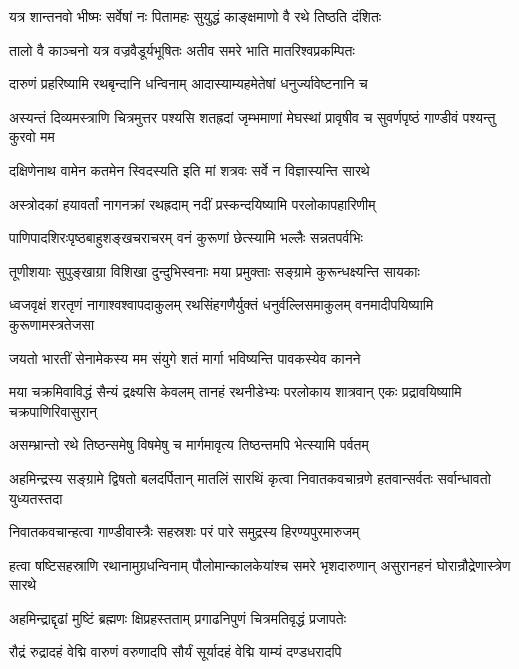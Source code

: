 \twolineshloka
{यत्र शान्तनवो भीष्मः सर्वेषां नः पितामहः}
{सुयुद्धं काङ्क्षमाणो वै रथे तिष्ठति दंशितः}


\twolineshloka
{तालो वै काञ्चनो यत्र वज्रवैडूर्यभूषितः}
{अतीव समरे भाति मातरिश्वप्रकम्पितः}


\twolineshloka
{दारुणं प्रहरिष्यामि रथबृन्दानि धन्विनाम्}
{आदास्याम्यहमेतेषां धनुर्ज्यावेष्टनानि च}


\onelineshloka
{अस्यन्तं दिव्यमस्त्राणि चित्रमुत्तर पश्यसि}
\twolineshloka
{शतह्रदां जृम्भमाणां मेघस्थां प्रावृषीव च}
{सुवर्णपृष्ठं गाण्डीवं पश्यन्तु कुरवो मम}


\twolineshloka
{दक्षिणेनाथ वामेन कतमेन स्विदस्यति}
{इति मां शत्रवः सर्वे न विज्ञास्यन्ति सारथे}


\twolineshloka
{अस्त्रोदकां हयावर्तां नागनक्रां रथह्रदाम्}
{नदीं प्रस्कन्दयिष्यामि परलोकापहारिणीम्}


\twolineshloka
{पाणिपादशिरःपृष्ठबाहुशङ्खचराचरम्}
{वनं कुरूणां छेत्स्यामि भल्लैः सन्नतपर्वभिः}


\twolineshloka
{तूणीशयाः सुपुङ्खाग्रा विशिखा दुन्दुभिस्वनाः}
{मया प्रमुक्ताः सङ्ग्रामे कुरून्धक्ष्यन्ति सायकाः}


\threelineshloka
{ध्वजवृक्षं शरतृणं नागाश्वश्वापदाकुलम्}
{रथसिंहगणैर्युक्तं धनुर्वल्लिसमाकुलम्}
{वनमादीपयिष्यामि कुरूणामस्त्रतेजसा}


\twolineshloka
{जयतो भारतीं सेनामेकस्य मम संयुगे}
{शतं मार्गा भविष्यन्ति पावकस्येव कानने}


\threelineshloka
{मया चक्रमिवाविद्धं सैन्यं द्रक्ष्यसि केवलम्}
{तानहं रथनीडेभ्यः परलोकाय शात्रवान्}
{एकः प्रद्रावयिष्यामि चक्रपाणिरिवासुरान्}


\twolineshloka
{असम्भ्रान्तो रथे तिष्ठन्समेषु विषमेषु च}
{मार्गमावृत्य तिष्ठन्तमपि भेत्स्यामि पर्वतम्}


\threelineshloka
{अहमिन्द्रस्य सङ्ग्रामे द्विषतो बलदर्पितान्}
{मातलिं सारथिं कृत्वा निवातकवचान्रणे}
{हतवान्सर्वतः सर्वान्धावतो युध्यतस्तदा}


\twolineshloka
{निवातकवचान्हत्वा गाण्डीवास्त्रैः सहस्रशः}
{परं पारे समुद्रस्य हिरण्यपुरमारुजम्}


\threelineshloka
{हत्वा षष्टिसहस्राणि रथानामुग्रधन्विनाम्}
{पौलोमान्कालकेयांश्च समरे भृशदारुणान्}
{असुरानहनं घोरान्रौद्रेणास्त्रेण सारथे}


\twolineshloka
{अहमिन्द्राद्दृढां मुष्टिं ब्रह्मणः क्षिप्रहस्तताम्}
{प्रगाढनिपुणं चित्रमतिवृद्धं प्रजापतेः}


\twolineshloka
{रौद्रं रुद्रादहं वेद्मि वारुणं वरुणादपि}
{सौर्यं सूर्यादहं वेद्मि याम्यं दण्डधरादपि}


